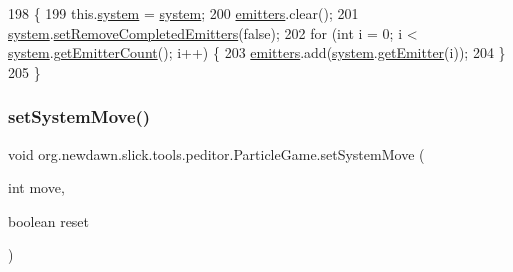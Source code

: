 \begin{DoxyCode}
198                                                  \{
199         this.\mbox{\hyperlink{classorg_1_1newdawn_1_1slick_1_1tools_1_1peditor_1_1_particle_game_a3a6d42e312039ae4f175e6751256f2f7}{system}} = \mbox{\hyperlink{classorg_1_1newdawn_1_1slick_1_1tools_1_1peditor_1_1_particle_game_a3a6d42e312039ae4f175e6751256f2f7}{system}};
200         \mbox{\hyperlink{classorg_1_1newdawn_1_1slick_1_1tools_1_1peditor_1_1_particle_game_a85dc9d5055b69f5a7ade60036db5d668}{emitters}}.clear();
201         \mbox{\hyperlink{classorg_1_1newdawn_1_1slick_1_1tools_1_1peditor_1_1_particle_game_a3a6d42e312039ae4f175e6751256f2f7}{system}}.\mbox{\hyperlink{classorg_1_1newdawn_1_1slick_1_1particles_1_1_particle_system_af471c877884c73411ed37a28755b62b0}{setRemoveCompletedEmitters}}(\textcolor{keyword}{false});
202         \textcolor{keywordflow}{for} (\textcolor{keywordtype}{int} i = 0; i < \mbox{\hyperlink{classorg_1_1newdawn_1_1slick_1_1tools_1_1peditor_1_1_particle_game_a3a6d42e312039ae4f175e6751256f2f7}{system}}.\mbox{\hyperlink{classorg_1_1newdawn_1_1slick_1_1particles_1_1_particle_system_a3103b9ed9a7b4a1f3316a94233092966}{getEmitterCount}}(); i++) \{
203             \mbox{\hyperlink{classorg_1_1newdawn_1_1slick_1_1tools_1_1peditor_1_1_particle_game_a85dc9d5055b69f5a7ade60036db5d668}{emitters}}.add(\mbox{\hyperlink{classorg_1_1newdawn_1_1slick_1_1tools_1_1peditor_1_1_particle_game_a3a6d42e312039ae4f175e6751256f2f7}{system}}.\mbox{\hyperlink{classorg_1_1newdawn_1_1slick_1_1particles_1_1_particle_system_a97e9702f67b46027303ab8e04bf120d3}{getEmitter}}(i));
204         \}
205     \}
\end{DoxyCode}
\mbox{\label{classorg_1_1newdawn_1_1slick_1_1tools_1_1peditor_1_1_particle_game_ab80789f63417c1a3b58bb9f487f0f876}} 
\subsubsection{\texorpdfstring{set\+System\+Move()}{setSystemMove()}}
{\footnotesize\ttfamily void org.\+newdawn.\+slick.\+tools.\+peditor.\+Particle\+Game.\+set\+System\+Move (\begin{DoxyParamCaption}\item[{int}]{move,  }\item[{boolean}]{reset }\end{DoxyParamCaption})\hspace{0.3cm}{\ttfamily [inline]}}

